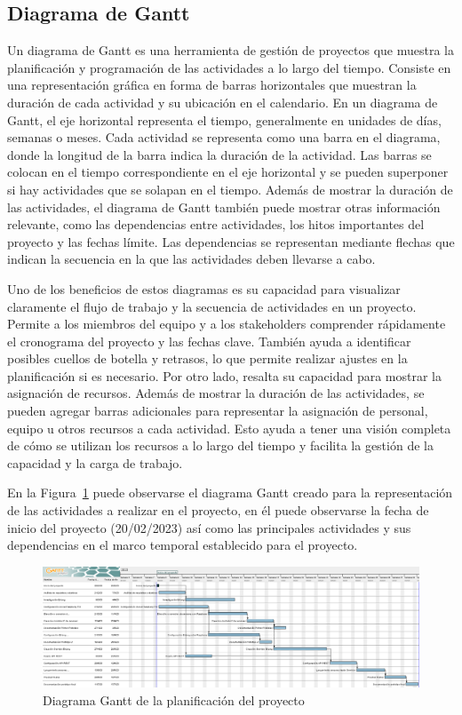 \clearpage
\subsection{Diagrama de Gantt}

Un diagrama de Gantt es una herramienta de gestión de proyectos que muestra la planificación y programación de las actividades a lo largo del tiempo. Consiste en una representación gráfica en forma de barras horizontales que muestran la duración de cada actividad y su ubicación en el calendario. En un diagrama de Gantt, el eje horizontal representa el tiempo, generalmente en unidades de días, semanas o meses. Cada actividad se representa como una barra en el diagrama, donde la longitud de la barra indica la duración de la actividad. Las barras se colocan en el tiempo correspondiente en el eje horizontal y se pueden superponer si hay actividades que se solapan en el tiempo. Además de mostrar la duración de las actividades, el diagrama de Gantt también puede mostrar otras información relevante, como las dependencias entre actividades, los hitos importantes del proyecto y las fechas límite. Las dependencias se representan mediante flechas que indican la secuencia en la que las actividades deben llevarse a cabo.

Uno de los beneficios de estos diagramas es su capacidad para visualizar claramente el flujo de trabajo y la secuencia de actividades en un proyecto. Permite a los miembros del equipo y a los stakeholders comprender rápidamente el cronograma del proyecto y las fechas clave. También ayuda a identificar posibles cuellos de botella y retrasos, lo que permite realizar ajustes en la planificación si es necesario. Por otro lado, resalta su capacidad para mostrar la asignación de recursos. Además de mostrar la duración de las actividades, se pueden agregar barras adicionales para representar la asignación de personal, equipo u otros recursos a cada actividad. Esto ayuda a tener una visión completa de cómo se utilizan los recursos a lo largo del tiempo y facilita la gestión de la capacidad y la carga de trabajo.

En la Figura~\ref{fig:gantt} puede observarse el diagrama Gantt creado para la representación de las actividades a realizar en el proyecto, en él puede observarse la fecha de inicio del proyecto (20/02/2023) así como las principales actividades y sus dependencias en el marco temporal establecido para el proyecto.


\begin{figure}[p]
\centering
\includegraphics[height=0.32\textheight,angle=90]{images/TFGGantt.png}
\caption[Diagrama de Gantt]{Diagrama Gantt de la planificación del proyecto}%
\label{fig:gantt}
\end{figure}

